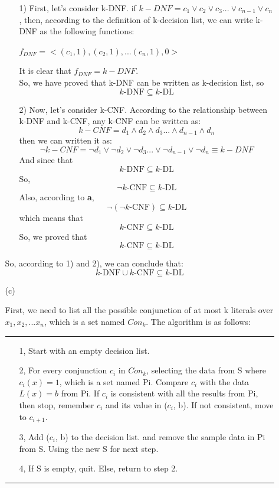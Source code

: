 \begin{enumerate}
\begin{enumerate}
\begin{enumerate}
\item[1) ] First, let's consider k-DNF. if $ k-DNF = c_1 \vee c_2 \vee c_3...\vee c_{n-1} \vee c_n $, then, according to the definition of k-decision list, we can write k-DNF as the following functions:
\begin{center}
$f_{DNF} = <(c_1, 1), (c_2, 1), ... (c_n, 1), 0>$\\
\end{center}
It is clear that $f_{DNF} = k-DNF$.\\

So, we have proved that k-DNF can be written as k-decision list, so $$k\textrm{-DNF} \subseteq k\textrm{-DL}$$

\item[2) ] Now, let's consider k-CNF. According to the relationship between k-DNF and k-CNF, any k-CNF can be written as: 
$$k-CNF = d_1 \wedge d_2 \wedge d_3...\wedge d_{n-1} \wedge d_n$$
then we can written it as:
$$\neg k-CNF = \neg d_1 \vee \neg d_2 \vee \neg d_3... \vee  \neg d_{n-1} \vee \neg d_n \equiv k-DNF$$
And since that 
$$k\textrm{-DNF} \subseteq k\textrm{-DL}$$
So, $$\neg k\textrm{-CNF} \subseteq k\textrm{-DL}$$
Also, according to {\bf a}, $$\neg (\neg k\textrm{-CNF}) \subseteq k\textrm{-DL}$$
which means that $$k\textrm{-CNF} \subseteq k\textrm{-DL}$$
So, we proved that $$k\textrm{-CNF} \subseteq k\textrm{-DL}$$
\end{enumerate}

So, according to 1) and 2), we can conclude that:
$$k\textrm{-DNF} \cup k\textrm{-CNF} \subseteq k\textrm{-DL}$$

\item[(c)]

First, we need to list all the possible conjunction of at most k literals over $x_1, x_2, ... x_n$, which is a set named $Con_k$. The algorithm is as follows:\\
\rule{14cm}{0.4pt}
\begin{enumerate}
\item[1, ] Start with an empty decision list.
\item[2, ] For every conjunction $c_i$ in $Con_k$, selecting the data from S where $c_i(x) = 1$, which is a set named Pi. Compare $c_i$ with the data $L(x) = b$ from Pi. If $c_i$ is consistent with all the results from Pi, then stop, remember $c_i$ and its value in ($c_i$, b). If not consistent, move to $c_{i+1}$.
\item[3, ] Add ($c_i$, b) to the decision list. and remove the sample data in Pi from S. Using the new S for next step.
\item[4, ] If S is empty, quit. Else, return to step 2.
\end{enumerate}
\rule{14cm}{0.4pt}


\end{enumerate}
\end{enumerate}

